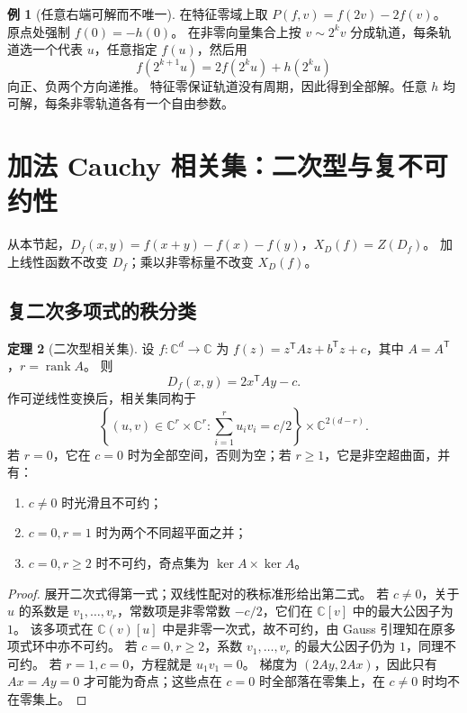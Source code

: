 \documentclass[UTF8,11pt,a4paper]{ctexart}
\theoremstyle{definition}
\newtheorem{theorem}{定理}[section]
\newtheorem{example}[theorem]{例}
\newcommand{\C}{\mathbb C}
\DeclareMathOperator{\rank}{rank}
\begin{document}
\begin{example}[任意右端可解而不唯一]
在特征零域上取 $P(f,v)=f(2v)-2f(v)$。
原点处强制 $f(0)=-h(0)$。
在非零向量集合上按 $v\sim2^k v$ 分成轨道，每条轨道选一个代表 $u$，任意指定 $f(u)$，然后用
\[
 f(2^{k+1}u)=2f(2^ku)+h(2^ku)
\]
向正、负两个方向递推。
特征零保证轨道没有周期，因此得到全部解。任意 $h$ 均可解，每条非零轨道各有一个自由参数。
\end{example}

\section{加法 Cauchy 相关集：二次型与复不可约性}\label{sec:geometry}
从本节起，$D_f(x,y)=f(x+y)-f(x)-f(y)$，$X_D(f)=Z(D_f)$。
加上线性函数不改变 $D_f$；乘以非零标量不改变 $X_D(f)$。

\subsection{复二次多项式的秩分类}
\begin{theorem}[二次型相关集]\label{thm:quadratic}
设 $f:\C^d\to\C$ 为
$f(z)=z^{\mathsf T}Az+b^{\mathsf T}z+c$，其中 $A=A^{\mathsf T}$，$r=\rank A$。
则
\[
 D_f(x,y)=2x^{\mathsf T}Ay-c.
\]
作可逆线性变换后，相关集同构于
\[
 \left\{(u,v)\in\C^r\times\C^r:\sum_{i=1}^r u_iv_i=c/2\right\}
 \times\C^{2(d-r)}.
\]
若 $r=0$，它在 $c=0$ 时为全部空间，否则为空；若 $r\ge1$，它是非空超曲面，并有：
\begin{enumerate}
\item $c\ne0$ 时光滑且不可约；
\item $c=0,r=1$ 时为两个不同超平面之并；
\item $c=0,r\ge2$ 时不可约，奇点集为 $\ker A\times\ker A$。
\end{enumerate}
\end{theorem}
\begin{proof}
展开二次式得第一式；双线性配对的秩标准形给出第二式。
若 $c\ne0$，关于 $u$ 的系数是 $v_1,\ldots,v_r$，常数项是非零常数 $-c/2$，它们在 $\C[v]$ 中的最大公因子为 $1$。
该多项式在 $\C(v)[u]$ 中是非零一次式，故不可约，由 Gauss 引理知在原多项式环中亦不可约。
若 $c=0,r\ge2$，系数 $v_1,\ldots,v_r$ 的最大公因子仍为 $1$，同理不可约。
若 $r=1,c=0$，方程就是 $u_1v_1=0$。
梯度为 $(2Ay,2Ax)$，因此只有 $Ax=Ay=0$ 才可能为奇点；这些点在 $c=0$ 时全部落在零集上，在 $c\ne0$ 时均不在零集上。
\end{proof}
\end{document}

